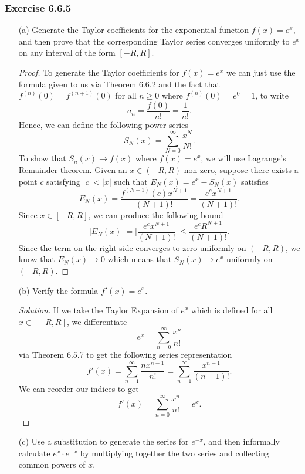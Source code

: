 \subsubsection{Exercise 6.6.5} 
\begin{enumerate}
    \item[(a)] Generate the Taylor coefficients for the exponential function \( f(x) = e^{x} \), and then prove that the corresponding Taylor series converges uniformly to \( e^{x} \) on any interval of the form \( [-R,R] \).
        \begin{proof}
        To generate the Taylor coefficients for \( f(x) = e^{x} \) we can just use the formula given to us via Theorem 6.6.2 and the fact that \( f^{(n)}(0) = f^{(n+1)}(0) \) for all \( n \geq 0  \) where \( f^{(n)}(0) = e^{0}= 1  \), to write 
        \[  a_n = \frac{ f(0)  }{ n! } = \frac{ 1 }{ n! }. \]
        Hence, we can define the following power series 
        \[  S_N(x) = \sum_{ N=0  }^{ \infty  } \frac{ x^N  }{ N! }. \]
        To show that \( S_n(x) \to f(x)  \) where \( f(x) = e^{x} \), we will use Lagrange's Remainder theorem. Given an \(  x \in (-R ,R ) \) non-zero, suppose there exists a point \( c  \) satisfying \( | c  | < | x  |  \) such that \( E_N(x) = e^{x} - S_{N}(x)   \) satisfies  
        \[  E_{N}(x) =  \frac{ f^{(N+1)}(c) x^{N+1} }{ (N+1)! }  =  \frac{ e^c x^{N+1} }{ (N+1)! } .   \]
        Since \( x \in [-R ,R ] \), we can produce the following bound 
        \[  | E_N(x)  | = \Big| \frac{ e^c x^{N+1}  }{ (N+1)!  }  \Big| \leq \frac{ e^{c} R^{N+1} }{ (N+1)! }.   \]
        Since the term on the right side converges to zero uniformly on \( (-R ,R ) \), we know that \( E_N(x) \to 0  \) which means that \(  S_N(x) \to e^{x} \) uniformly on \( (-R ,R ) \).
        \end{proof}
    \item[(b)] Verify the formula \( f'(x) = e^{x} \).
        \begin{proof}[Solution]
            If we take the Taylor Expansion of \( e^{x} \) which is defined for all \( x \in [-R ,R ] \), we differentiate 
            \[  e^{x} = \sum_{ n=0  }^{ \infty  } \frac{ x^{n} }{ n! }  \] via Theorem 6.5.7 to get the following series representation 
            \[  f'(x) = \sum_{ n=1 }^{ \infty  } \frac{ n x^{n-1} }{ n! } =   \sum_{ n=1 }^{ \infty  } \frac{ x^{n-1} }{ (n-1)! }. \]
            We can reorder our indices to get 
            \[  f'(x) = \sum_{ n=0  }^{ \infty  } \frac{ x^{n} }{ n! } = e^{x}. \]
        \end{proof}
    \item[(c)] Use a substitution to generate the series for \( e^{-x} \), and then informally calculate \( e^{x} \cdot e^{-x} \) by multiplying together the two series and collecting common powers of \( x \).

\end{enumerate}
